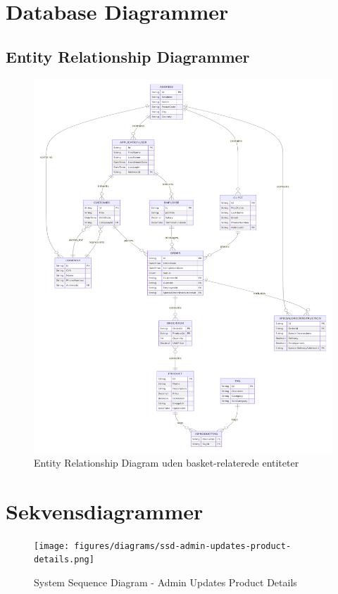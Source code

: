 \section{Database Diagrammer}

\subsection{Entity Relationship Diagrammer}
\label{appendix:entity-relationship-diagrams}
\begin{figure}
    \centering
    \includegraphics[width=1\textwidth]{figures/diagrams/erd-db-without-basket.png}
    \caption{Entity Relationship Diagram uden basket-relaterede entiteter}
    \label{fig:entity-relationship-diagram-nobasket}
\end{figure}

\section{Sekvensdiagrammer}
\label{appendix:sequence-diagrams}
\begin{figure}
    \centering
    \texttt{[image: figures/diagrams/ssd-admin-updates-product-details.png]}
    \caption{System Sequence Diagram - Admin Updates Product Details}
    \label{fig:ssd-admin-updates-product-details}
\end{figure}


